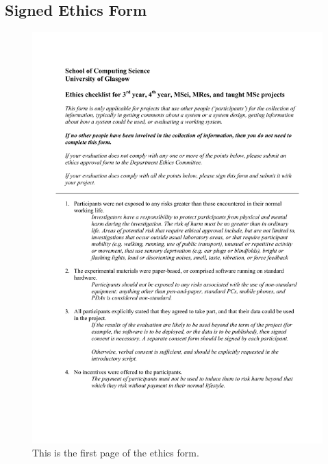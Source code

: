 \documentclass{l4proj}
\begin{document}
\begin{appendices}
\chapter{Signed Ethics Form}
\begin{figure}[htb]
    \centering
    \includegraphics[width=\linewidth]{images/signed_ethics_form_1-1.pdf}
    \caption{This is the first page of the ethics form.}
    \label{fig:ethics_form_1} 
\end{figure}


\end{appendices}
\end{document}
